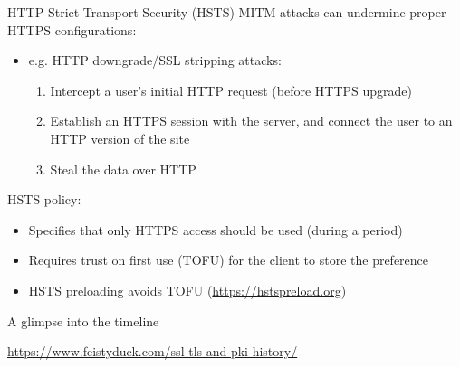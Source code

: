 \begin{frame}{HTTP Strict Transport Security (HSTS)}
  \pause
  MITM attacks can undermine proper HTTPS configurations:
  \begin{itemize}[<+(1)->]
    \item e.g. HTTP downgrade/SSL stripping attacks:
    \begin{enumerate}
      \item Intercept a user's initial HTTP request (before HTTPS upgrade)
      \item Establish an HTTPS session with the server, and connect the user to an HTTP version of the site
      \item Steal the data over HTTP
    \end{enumerate}
  \end{itemize}
  
  \pause
  HSTS policy:
  \begin{itemize}[<+(1)->]
    \item Specifies that only HTTPS access should be used (during a period)
    \item Requires trust on first use (TOFU) for the client to store the preference
    \item HSTS preloading avoids TOFU ({\small\url{https://hstspreload.org}})
  \end{itemize}
\end{frame}

\begin{frame}{A glimpse into the timeline}
  \begin{center}
    \url{https://www.feistyduck.com/ssl-tls-and-pki-history/}
  \end{center}
\end{frame}


